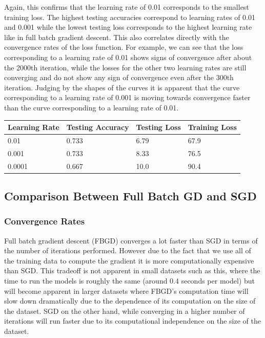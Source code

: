 \documentclass[11pt,letterpaper,titlepage]{article}
\begin{document}
	Again, this confirms that the learning rate of 0.01 corresponds to the smallest training loss. The highest testing accuracies correspond to learning rates of 0.01 and 0.001 while the lowest testing loss corresponds to the highest learning rate like in full batch gradient descent. This also correlates directly with the convergence rates of the loss function. For example, we can see that the loss corresponding to a learning rate of 0.01 shows signs of convergence after about the 2000th iteration, while the losses for the other two learning rates are still converging and do not show any sign of convergence even after the 300th iteration. Judging by the shapes of the curves it is apparent that the curve corresponding to a learning rate of 0.001 is moving towards convergence faster than the curve corresponding to a learning rate of 0.01.
	
	\begin{tabular}{|l|l|l|l|}
		\hline
		Learning Rate & Testing Accuracy & Testing Loss & Training Loss \\ \hline
		0.01          & 0.733            & 6.79         & 67.9          \\ \hline
		0.001         & 0.733            & 8.33         & 76.5          \\ \hline
		0.0001        & 0.667            & 10.0         & 90.4          \\ \hline
	\end{tabular}
	\label{SGD}
	
	\subsection{Comparison Between Full Batch GD and SGD}
	\subsubsection{Convergence Rates}
	Full batch gradient descent (FBGD) converges a lot faster than SGD in terms of the number of iterations performed. However due to the fact that we use all of the training data to compute the gradient it is more computationally expensive than SGD. This tradeoff is not apparent in small datasets such as this, where the time to run the models is roughly the same (around 0.4 seconds per model) but will become apparent in larger datasets where FBGD's computation time will slow down dramatically due to the dependence of its computation on the size of the dataset. SGD on the other hand, while converging in a higher number of iterations will run faster due to its computational independence on the size of the dataset.
\end{document}
